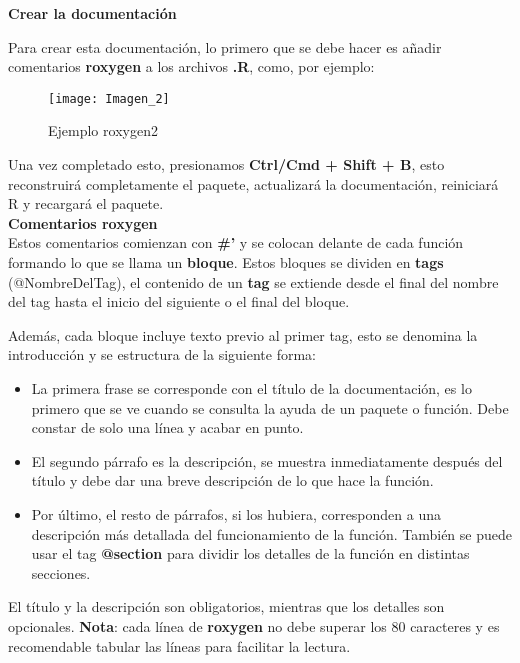 \textbf{Crear la documentaci\'on}

Para crear esta documentaci\'on, lo primero que se debe hacer es a\~nadir comentarios
\textbf{roxygen} a los archivos \textbf{.R}, como, por ejemplo:

\begin{figure}[H]
    \centering
    \texttt{[image: Imagen\_2]}
    \caption{Ejemplo roxygen2   }
    \label{fig:roxygen2}
\end{figure} 

Una vez completado esto, presionamos \textbf{Ctrl/Cmd + Shift + B}, esto reconstruir\'a
completamente el paquete, actualizar\'a la documentaci\'on, reiniciar\'a R y recargar\'a el
paquete. \\

\textbf{Comentarios roxygen} \\
Estos comentarios comienzan con \textbf{\#'} y se colocan delante de cada funci\'on formando lo que
se llama un \textbf{bloque}. Estos bloques se dividen en \textbf{tags} (@NombreDelTag), el contenido de un
\textbf{tag} se extiende desde el final del nombre del tag hasta el inicio del siguiente o el final del
bloque.

Adem\'as, cada bloque incluye texto previo al primer tag, esto se denomina la introducci\'on y
se estructura de la siguiente forma:

\begin{itemize}
    \item La primera frase se corresponde con el t\'itulo de la documentaci\'on, es lo primero que
se ve cuando se consulta la ayuda de un paquete o funci\'on. Debe constar de solo
una l\'inea y acabar en punto.
    \item El segundo p\'arrafo es la descripci\'on, se muestra inmediatamente despu\'es del t\'itulo y
debe dar una breve descripci\'on de lo que hace la funci\'on.
    \item Por \'ultimo, el resto de p\'arrafos, si los hubiera, corresponden a una descripci\'on m\'as
detallada del funcionamiento de la funci\'on. Tambi\'en se puede usar el tag \textbf{@section}
para dividir los detalles de la funci\'on en distintas secciones.
\end{itemize}

El t\'itulo y la descripci\'on son obligatorios, mientras que los detalles son opcionales.
\textbf{Nota}: cada l\'inea de \textbf{roxygen} no debe superar los 80 caracteres y es recomendable tabular
las l\'ineas para facilitar la lectura.\\


